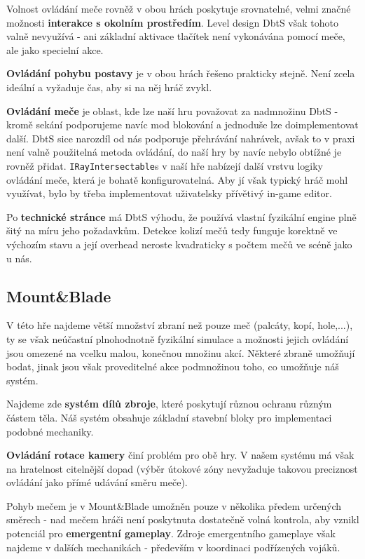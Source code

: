 Volnost ovládání meče rovněž v obou hrách poskytuje srovnatelné, velmi značné možnosti \textbf{interakce s okolním prostředím}. Level design \acl{DbtS} však tohoto valně nevyužívá - ani základní aktivace tlačítek není vykonávána pomocí meče, ale jako specielní akce.

\textbf{Ovládání pohybu postavy} je v obou hrách řešeno prakticky stejně. Není zcela ideální a vyžaduje čas, aby si na něj hráč zvykl.

\textbf{Ovládání meče} je oblast, kde lze naší hru považovat za nadmnožinu \acl{DbtS} - kromě sekání podporujeme navíc mod blokování a jednoduše lze doimplementovat další. \acl{DbtS} sice narozdíl od nás podporuje přehrávání nahrávek, avšak to v praxi není valně použitelná metoda ovládání, do naší hry by navíc nebylo obtížné je rovněž přidat. \texttt{IRayIntersectable}s v naší hře nabízejí další vrstvu logiky ovládání meče, která je bohatě konfigurovatelná. Aby jí však typický hráč mohl využívat, bylo by třeba implementovat uživatelsky přívětivý in-game editor.  

Po \textbf{technické stránce} má \acl{DbtS} výhodu, že používá vlastní fyzikální engine plně šitý na míru jeho požadavkům. Detekce kolizí mečů tedy funguje korektně ve výchozím stavu a její overhead neroste kvadraticky s počtem mečů ve scéně jako u nás. 



\subsection{Mount\&Blade}

V této hře najdeme větší množství zbraní než pouze meč (palcáty, kopí, hole,...), ty se však neúčastní plnohodnotně fyzikální simulace a možnosti jejich ovládání jsou omezené na vcelku malou, konečnou množinu akcí. Některé zbraně umožňují bodat, jinak jsou však proveditelné akce podmnožinou toho, co umožňuje náš systém.

Najdeme zde \textbf{systém dílů zbroje}, které poskytují různou ochranu různým částem těla. Náš systém obsahuje základní stavební bloky pro implementaci podobné mechaniky.

\textbf{Ovládání rotace kamery} činí problém pro obě hry. V našem systému má však na hratelnost citelnější dopad (výběr útokové zóny nevyžaduje takovou preciznost ovládání jako přímé udávání směru meče).

Pohyb mečem je v Mount\&Blade umožněn pouze v několika předem určených směrech - nad mečem hráči není poskytnuta dostatečně volná kontrola, aby vznikl potenciál pro \textbf{emergentní gameplay}. Zdroje emergentního gameplaye však najdeme v dalších mechanikách - především v koordinaci podřízených vojáků. 

